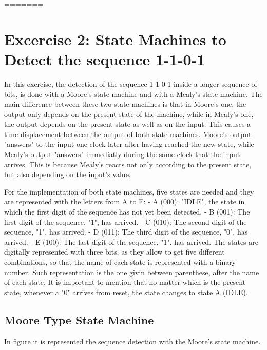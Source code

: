=======

\section{\color{olive}Excercise 2: State Machines to Detect the sequence 1-1-0-1}
In this exercise, the detection of the sequence 1-1-0-1 inside a longer sequence of bits, is done with a Moore's state machine and with a Mealy's state machine. The main difference between these two state machines is that in Moore's one, the output only depends on the present state of the machine, while in Mealy's one, the output depends on the present state as well as on the input. This causes a time displacement between the output of both state machines. Moore's output "answers" to the input one clock later after having reached the new state, while Mealy's output "answers" immediatly during the same clock that the input arrives. This is because Mealy's reacts not only according to the present state, but also depending on the input's value.

For the implementation of both state machines, five states are needed and they are represented with the letters from A to E: 
- A (000): "IDLE", the state in which the first digit of the sequence has not yet been detected.
- B (001): The first digit of the sequence, "1", has arrived.
- C (010): The second digit of the sequence, "1",  has arrived.
- D (011): The third digit of the sequence, "0", has arrived.
- E (100): The last digit of the sequence, "1", has arrived.
The states are digitally represented with three bits, as they allow to get five different combinations, so that the name of each state is represented with a binary number. Such representation is the one givin between parenthese, after the name of each state.  It is important to mention that no matter which is the present state, whenever a "0" arrives from reset, the state changes to state A (IDLE). 

\subsection{\color{purple}Moore Type State Machine}

In figure %
it is represented the sequence detection with the Moore's state machine.


